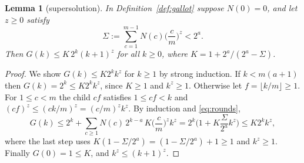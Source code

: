 \documentclass[11pt]{article}
\newtheorem{lemma}[theorem]{Lemma}
\theoremstyle{definition}
\theoremstyle{remark}
\begin{document}
\begin{lemma}[supersolution]\label{lem:supersolution}
In Definition~\ref{def:gallot} suppose $N(0)=0$, and let $z\ge0$ satisfy
\[
  \Sigma:=\sum_{c=1}^{m-1}N(c)\Big(\frac cm\Big)^z<2^a .
\]
Then $G(k)\le K\,2^k(k+1)^z$ for all $k\ge0$, where $K=1+2^a/(2^a-\Sigma)$.
\end{lemma}
\begin{proof}
We show $G(k)\le K2^kk^z$ for $k\ge1$ by strong induction. If $k<m(a+1)$ then
$G(k)=2^k\le K2^kk^z$, since $K\ge1$ and $k^z\ge1$. Otherwise let $f=\lfloor k/m\rfloor\ge1$. For
$1\le c<m$ the child $cf$ satisfies $1\le cf<k$ and $(cf)^z\le(ck/m)^z=(c/m)^zk^z$. By induction and
\eqref{eq:rounds},
\[
  G(k)\le2^k+\sum_{c\ge1}N(c)\,2^{k-a}\,K\Big(\frac cm\Big)^zk^z
  =2^k\Big(1+K\frac{\Sigma}{2^a}k^z\Big)\le K2^kk^z ,
\]
where the last step uses $K(1-\Sigma/2^a)=(1-\Sigma/2^a)+1\ge1$ and $k^z\ge1$. Finally
$G(0)=1\le K$, and $k^z\le(k+1)^z$.
\end{proof}
\end{document}

